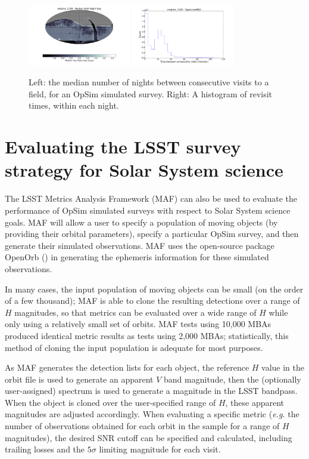 \documentclass{iau}
\begin{document}
\begin{figure}[tb]
\centering
\includegraphics[width=0.4\textwidth]{internight}
\includegraphics[width=0.4\textwidth]{intranight}
\caption{Left: the median number of nights between consecutive
  visits to a field, for an OpSim simulated survey. Right: A histogram
  of revisit times, within each night.
\label{time}}
\end{figure}


\section{Evaluating the LSST survey strategy for Solar System science}

The LSST Metrics Analysis Framework (MAF) can also be used to evaluate the
performance of OpSim simulated surveys with respect to Solar System
science goals. MAF will allow a user to specify a population of moving
objects (by providing their orbital parameters), specify a particular
OpSim survey, and then generate their simulated observations. MAF uses
the open-source package OpenOrb (\cite{oorb}) in generating the
ephemeris information for these simulated observations.

In many cases, the input population of moving objects can be
small (on the order of a few thousand); MAF is able to clone the resulting
detections over a range of $H$ magnitudes, so that 
metrics can be evaluated over a wide range of $H$ while only
using a relatively small set of orbits. MAF tests using 10,000 MBAs
produced identical metric results as tests using 2,000 MBAs;
statistically, this method of cloning the input population is 
adequate for most purposes.

As MAF generates the detection lists for each object, the reference
$H$ value in the orbit file is used to generate an apparent $V$ band
magnitude, then the (optionally user-assigned) spectrum is used to
generate a magnitude in the LSST bandpass. When the object is cloned
over the user-specified range of $H$, these apparent magnitudes are
adjusted accordingly. When evaluating a specific metric ({\it e.g.}
the number of observations obtained for each orbit in the sample for a
range of $H$ magnitudes), the desired SNR cutoff can be specified and
calculated, including trailing losses and the $5\sigma$ limiting magnitude for each visit.
\end{document}

